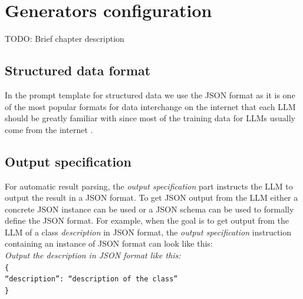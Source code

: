 \chapter{Generators configuration}


\noindent{}TODO: Brief chapter description


\section{Structured data format}

In the prompt template for structured data we use the JSON format as it is one of the most popular formats for data interchange on the internet that each LLM should be greatly familiar with since most of the training data for LLMs usually come from the internet \cite{Zhao2023}.


\section{Output specification}

For automatic result parsing, the \emph{output specification} part instructs the LLM to output the result in a JSON format. To get JSON output from the LLM either a concrete JSON instance can be used or a JSON schema can be used to formally define the JSON format. For example, when the goal is to get output from the LLM of a class \textit{description} in JSON format, the \emph{output specification} instruction containing an instance of JSON format can look like this: \\

\noindent{}\textit{Output the description in JSON format like this:} \\
\texttt{\frenchspacing\{ \\
\null \quad ``description'': ``description of the class'' \\
\}} \\

